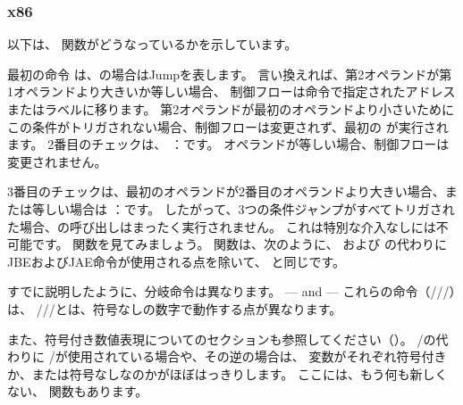 \subsubsection{x86}


以下は、 関数がどうなっているかを示しています。




最初の命令 \JLE は、の場合はJumpを表します。 
言い換えれば、第2オペランドが第1オペランドより大きいか等しい場合、
制御フローは命令で指定されたアドレスまたはラベルに移ります。 
第2オペランドが最初のオペランドより小さいためにこの条件がトリガされない場合、制御フローは変更されず、最初の \printf が実行されます。 
2番目のチェックは、 \JNE ：です。 
オペランドが等しい場合、制御フローは変更されません。

3番目のチェックは、最初のオペランドが2番目のオペランドより大きい場合、または等しい場合は \JGE ：です。 
したがって、3つの条件ジャンプがすべてトリガされた場合、\printf の呼び出しはまったく実行されません。 
これは特別な介入なしには不可能です。 
関数を見てみましょう。 
関数は、次のように、 \JLE および \JGE の代わりにJBEおよびJAE命令が使用される点を除いて、
と同じです。




すでに説明したように、分岐命令は異なります。
\JBE--- and \JAE---
これらの命令（\JA/\JAE/\JB/\JBE）は、 \JG/\JGE/\JL/\JLE とは、符号なしの数字で動作する点が異なります。


また、符号付き数値表現についてのセクションも参照してください（）。 
\JA/\JB の代わりに \JG/\JL が使用されている場合や、その逆の場合は、
変数がそれぞれ符号付きか、または符号なしなのかがほぼはっきりします。
ここには、もう何も新しくない、 \main 関数もあります。

